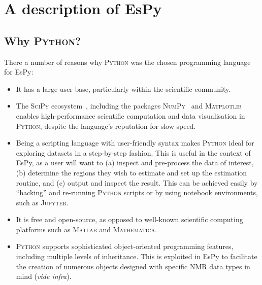 \section{A description of \acs{EsPy}}

\subsection{Why \textsc{Python}?}
There a number of reasons why \textsc{Python} was the chosen programming
language for \ac{EsPy}:
\begin{itemize}
    \item It has a large user-base, particularly within the scientific
        community.
    \item The \textsc{SciPy} ecosystem~\cite{Virtanen2020}, including the packages
        \textsc{NumPy}~\cite{Harris2020} and
        \textsc{Matplotlib}~\cite{Hunter2007} enables
        high-performance scientific computation and data visualisation in
        \textsc{Python}, despite the language's reputation for slow speed.
    \item Being a scripting language with user-friendly syntax makes
        \textsc{Python} ideal for exploring datasets in a step-by-step fashion.
        This is useful in the context of \ac{EsPy}, as a user will want to
        (a) inspect and pre-process the data of interest,
        (b) determine the regions they wish to estimate and set up the
        estimation routine,
        and (c) output and inspect the result.
        This can be achieved easily by ``hacking'' and re-running
        \textsc{Python} scripts or by using notebook environments, such as
        \textsc{Jupyter}.
    \item It is free and open-source, as opposed to well-known scientific
        computing platforms such as \textsc{Matlab} and \textsc{Mathematica}.
    \item \textsc{Python} supports sophisticated object-oriented programming
        features, including multiple levels of inheritance. This is exploited in
        \ac{EsPy} to facilitate the creation of numerous objects designed with
        specific \ac{NMR} data types in mind (\textit{vide infra}).
\end{itemize}

